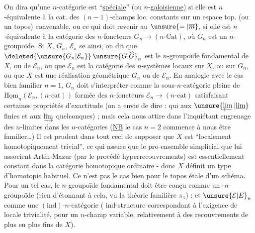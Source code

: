 On dira qu'une $n$-catégorie  est ``\uline{spéciale}'' (ou $n$-\uline{galoisienne}) si elle est $n$-équivalente à la cat. des $(n-1)$-champs loc. constants sur un espace top. (ou un topos) convenable, ou ce qui doit revenir au $\unsure{=|\overline m}$, si elle est $n$-équivalente à la catégorie des $n$-foncteurs $G_n\longrightarrow(n\text{-}\mathrm{Cat})$, où $G_n$ est un $n$-groupoïde. Si $X$, $G_n$, $\mathcal E_n$ se  ainsi, on dit que $\deleted{\unsure{G_n|\mathcal E_n}}\,\unsure{G|\widehat G}_n$ est le $n$-groupoïde fondamental de $X$, ou de $\mathcal E_n$, ou que $\mathcal E_n$ est la catégorie des $n$-systèmes locaux sur $X$, ou sur $G_n$, ou que $X$ est une réalisation géométrique  $G_n$ ou de $\mathcal E_n$. En analogie avec le cas bien familier $n=1$, $G_n$ doit s'interpréter comme la sous-$n$-catégorie pleine de $\underline{\mathrm{Hom}}_n(\mathcal E_n,(n\text{-}\mathrm{cat}))$ formée des $n$-foncteurs $\mathcal E_n\to(n\text{-}\mathrm{cat})$ satisfaisant certaines propriétés d'exactitude (on a envie de dire : qui  aux $\unsure{\varprojlim|\underline{\lim}}$ finies et aux $\varinjlim$ quelconques) ; mais cela nous attire dans l'inquiétant engrenage des $n$-limites dans les $n$-catégories (\uline{NB} le cas $n=2$ commence à nous être familier\ldots) Il est prudent dans tout
ceci de supposer que $X$ est ``localement homotopiquement trivial'', ce qui assure que le pro-ensemble simplicial que lui associent Artin-Mazur (par le procédé  hyperrecouvrements) est essentiellement constant dans la catégorie homotopique ordinaire - donc $X$ définit un type d'homotopie habituel. Ce n'est \uline{pas} le cas bien  pour le topos étale d'un schéma. Pour un tel cas, le $n$-groupoïde fondamental doit être conçu comme un -$n$-groupoïde (rien d'étonnant à cela, vu la théorie familière  $\pi_1$) ; et $\unsure{\mathcal E|E}_n$ comme une $(\mathrm{ind})$-$n$-catégorie ( ind-structure correspondant à l'exigence de locale trivialité, pour un $n$-champ variable, relativement à des recouvrements de plus en plus fins de $X$).



